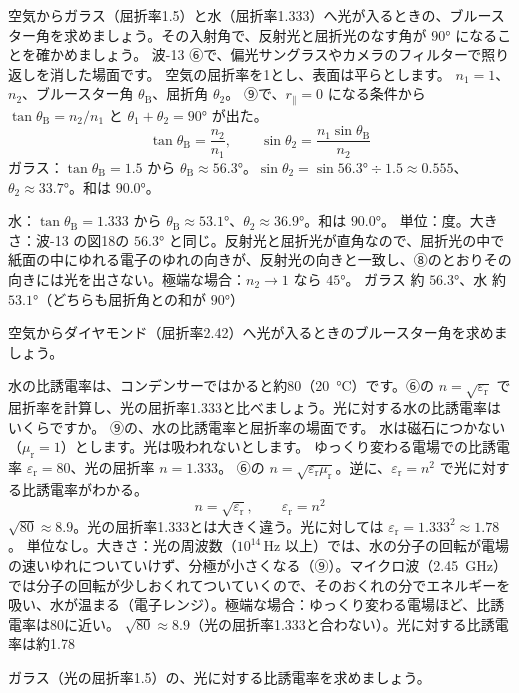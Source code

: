 \begin{phreidai}[ガラスと水のブルースター角]
\label{ph:電-15:ex9}空気からガラス（屈折率1.5）と水（屈折率1.333）へ光が入るときの、ブルースター角を求めましょう。その入射角で、反射光と屈折光のなす角が $90°$ になることを確かめましょう。
\phbamen
波-13 ⑥で、偏光サングラスやカメラのフィルターで照り返しを消した場面です。
\phmushi
空気の屈折率を1とし、表面は平らとします。
\phzu
$n_1=1$、$n_2$、ブルースター角 $\theta_{\mathrm B}$、屈折角 $\theta_2$。
\phriyu
⑨で、$r_\parallel=0$ になる条件から $\tan\theta_{\mathrm B}=n_2/n_1$ と $\theta_1+\theta_2=90°$ が出た。
\phtateru
\[ \tan\theta_{\mathrm B}=\frac{n_2}{n_1},\qquad \sin\theta_2=\frac{n_1\sin\theta_{\mathrm B}}{n_2} \]
\phtoku
ガラス：$\tan\theta_{\mathrm B}=1.5$ から $\theta_{\mathrm B}\approx56.3°$。$\sin\theta_2=\sin56.3°\div1.5\approx0.555$、$\theta_2\approx33.7°$。和は $90.0°$。\par
水：$\tan\theta_{\mathrm B}=1.333$ から $\theta_{\mathrm B}\approx53.1°$、$\theta_2\approx36.9°$。和は $90.0°$。
\phtashikame
単位：度。大きさ：波-13 の図18の $56.3°$ と同じ。反射光と屈折光が直角なので、屈折光の中で紙面の中にゆれる電子のゆれの向きが、反射光の向きと一致し、⑧のとおりその向きには光を出さない。極端な場合：$n_2\to1$ なら $45°$。
\kotae ガラス 約 $56.3°$、水 約 $53.1°$（どちらも屈折角との和が $90°$）
\end{phreidai}
\begin{jibun}
空気からダイヤモンド（屈折率2.42）へ光が入るときのブルースター角を求めましょう。
\end{jibun}

\begin{phreidai}[水の比誘電率と屈折率]
\label{ph:電-15:ex10}水の比誘電率は、コンデンサーではかると約80（\qty{20}{\celsius}）です。⑥の $n=\sqrt{\varepsilon_{\mathrm r}}$ で屈折率を計算し、光の屈折率1.333と比べましょう。光に対する水の比誘電率はいくらですか。
\phbamen
⑨の、水の比誘電率と屈折率の場面です。
\phmushi
水は磁石につかない（$\mu_{\mathrm r}=1$）とします。光は吸われないとします。
\phzu
ゆっくり変わる電場での比誘電率 $\varepsilon_{\mathrm r}=80$、光の屈折率 $n=1.333$。
\phriyu
⑥の $n=\sqrt{\varepsilon_{\mathrm r}\mu_{\mathrm r}}$。逆に、$\varepsilon_{\mathrm r}=n^2$ で光に対する比誘電率がわかる。
\phtateru
\[ n=\sqrt{\varepsilon_{\mathrm r}},\qquad \varepsilon_{\mathrm r}=n^2 \]
\phtoku
$\sqrt{80}\approx8.9$。光の屈折率1.333とは大きく違う。光に対しては $\varepsilon_{\mathrm r}=1.333^2\approx1.78$。
\phtashikame
単位なし。大きさ：光の周波数（$10^{14}$\,Hz 以上）では、水の分子の回転が電場の速いゆれについていけず、分極が小さくなる（⑨）。マイクロ波（\qty{2.45}{GHz}）では分子の回転が少しおくれてついていくので、そのおくれの分でエネルギーを吸い、水が温まる（電子レンジ）。極端な場合：ゆっくり変わる電場ほど、比誘電率は80に近い。
\kotae $\sqrt{80}\approx8.9$（光の屈折率1.333と合わない）。光に対する比誘電率は約1.78
\end{phreidai}
\begin{jibun}
ガラス（光の屈折率1.5）の、光に対する比誘電率を求めましょう。
\end{jibun}

